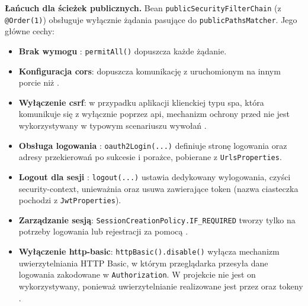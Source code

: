 \medskip
\noindent\textbf{Łańcuch dla ścieżek publicznych.}
Bean \texttt{publicSecurityFilterChain} \newline (z \texttt{@Order(1)}) obsługuje wyłącznie żądania
pasujące do \texttt{publicPathsMatcher}. Jego główne cechy:
\begin{itemize}
    \item \textbf{Brak wymogu }: \texttt{permitAll()} dopuszcza każde żądanie.
    \item \textbf{Konfiguracja \gls{cors}}: dopuszcza komunikację z  uruchomionym na innym porcie
    niż .
    \item \textbf{Wyłączenie \gls{csrf}}: w przypadku aplikacji klienckiej typu \gls{spa}, która komunikuje się z 
    wyłącznie poprzez \gls{api}, mechanizm ochrony przed  nie jest wykorzystywany w typowym scenariuszu wywołań .
    \item \textbf{Obsługa logowania }: \texttt{oauth2Login(...)} definiuje stronę logowania oraz adresy przekierowań
    po sukcesie i porażce, pobierane z \texttt{UrlsProperties}.
    \item \textbf{Logout dla sesji }: \texttt{logout(...)} ustawia dedykowany  wylogowania,
    czyści \gls{security-context}, unieważnia  oraz usuwa  zawierające token
    (nazwa ciasteczka pochodzi z \texttt{JwtProperties}).
    \item \textbf{Zarządzanie sesją}: \texttt{SessionCreationPolicy.IF\_REQUIRED} tworzy  tylko na potrzeby logowania lub rejestracji za pomocą .
    \item \textbf{Wyłączenie \gls{http-basic}}: \texttt{httpBasic().disable()} wyłącza mechanizm uwierzytelniania HTTP Basic,
    w którym przeglądarka przesyła dane logowania zakodowane w  \texttt{Authorization}.
    W projekcie nie jest on wykorzystywany, ponieważ uwierzytelnianie realizowane jest przez  oraz tokeny .
\end{itemize}

